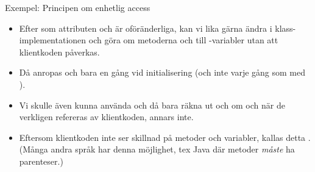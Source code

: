 \begin{Slide}{Exempel: Principen om enhetlig access}\SlideFontSmall
{}
\pause
\begin{itemize}
\item Efter som attributen  och  är oföränderliga, kan vi lika gärna ändra i klass-implementationen och göra om metoderna  och  till -variabler utan att klientkoden påverkas.

\item Då anropas  och  bara en gång vid initialisering (och inte varje gång som med ).

\item Vi skulle även kunna använda  och då bara räkna ut  och  om och när de verkligen refereras av klientkoden, annars inte.

\item Eftersom klientkoden inte ser skillnad på metoder och variabler, kallas detta . (Många andra språk har  denna möjlighet, tex Java där metoder \emph{måste} ha parenteser.)
\end{itemize}
\end{Slide}




